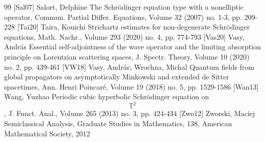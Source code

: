 \begin{thebibliography}{99}
 [Sal07] Salort, Delphine The Schrödinger equation type with a nonelliptic operator, Commun. Partial Differ. Equations, Volume 32 (2007) no. 1-3, pp. 209-228
 [Tai20] Taira, Kouichi Strichartz estimates for non-degenerate Schrödinger equations, Math. Nachr., Volume 293 (2020) no. 4, pp. 774-793
 [Vas20] Vasy, András Essential self-adjointness of the wave operator and the limiting absorption principle on Lorentzian scattering spaces, J. Spectr. Theory, Volume 10 (2020) no. 2, pp. 439-461
 [VW18] Vasy, András; Wrochna, Michal Quantum fields from global propagators on asymptotically Minkowski and extended de Sitter spacetimes, Ann. Henri Poincaré, Volume 19 (2018) no. 5, pp. 1529-1586
 [Wan13] Wang, Yuzhao Periodic cubic hyperbolic Schrödinger equation on $$\mathbb{T}^{2}$$, J. Funct. Anal., Volume 265 (2013) no. 3, pp. 424-434
 [Zwo12] Zworski, Maciej Semiclassical Analysis, Graduate Studies in Mathematics, 138, American Mathematical Society, 2012
\end{thebibliography}
